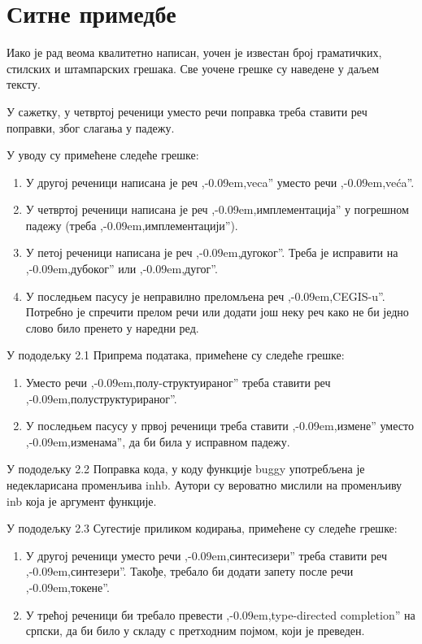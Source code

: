 \documentclass[a4paper]{report}
\def\zn{,\kern-0.09em,}
\begin{document}
\section{Ситне примедбе}
\par Иако је рад веома квалитетно написан, уочен је известан број граматичких, стилских и штампарских грешака. Све уочене грешке су наведене у даљем тексту.

\par У сажетку, у четвртој реченици уместо речи поправка треба ставити реч поправки, због слагања у падежу.

\par У уводу су примећене следеће грешке:
\begin{enumerate}
\item У другој реченици написана је реч \zn veca'' уместо речи \zn veća''.
\item У четвртој реченици написана је реч \zn имплементација'' у погрешном падежу (треба \zn имплементацији'').
\item У петој реченици написана је реч \zn дугоког''. Треба је исправити на \zn дубоког'' или \zn дугог''.
\item У последњем пасусу је неправилно преломљена реч \zn CEGIS-u''. Потребно је спречити прелом речи или додати још неку реч како не би једно слово било пренето у наредни ред.
\end{enumerate}

\par У пододељку 2.1 Припрема података, примећене су следеће грешке:
\begin{enumerate}
\item Уместо речи \zn полу-структуираног'' треба ставити реч \zn полуструктурираног''.
\item У последњем пасусу у првој реченици треба ставити \zn измене'' уместо \zn изменама'', да би била у исправном падежу.
\end{enumerate}

\par У пододељку 2.2 Поправка кода, у коду функције buggy употребљена је недекларисана променљива inhb. Аутори су вероватно мислили на променљиву inb која је аргумент функције.

\par У пододељку 2.3 Сугестије приликом кодирања, примећене су следеће грешке:
\begin{enumerate}
\item У другој реченици уместо речи \zn синтесизери'' треба ставити реч \zn синтезери''. Такође, требало би додати запету после речи \zn токене''.
\item У трећој реченици би требало превести \zn type-directed completion'' на српски, да би било у складу с претходним појмом, који је преведен.
\end{enumerate}
\end{document}
